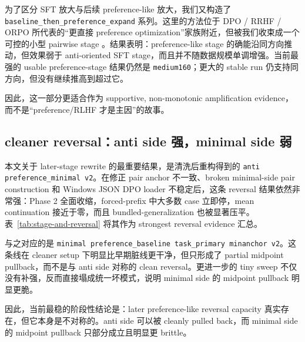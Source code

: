 \documentclass[12pt]{ctexart}
\begin{document}
为了区分 SFT 放大与后续 preference-like 放大，我们又构造了 \texttt{baseline\_then\_preference\_expand} 系列。这里的方法位于 DPO / RRHF / ORPO 所代表的“更直接 preference optimization”家族附近，但被我们收束成一个可控的小型 pairwise stage \citep{rafailov2023dpo,yuan2023rrhf,hong2024orpo}。结果表明：preference-like stage 的确能沿同方向推动，但效果弱于 anti-oriented SFT stage，而且并不随数据规模单调增强。当前最强的 usable preference-stage 结果仍然是 \texttt{medium160}；更大的 stable run 仍支持同方向，但没有继续推高到超过它。

因此，这一部分更适合作为 supportive, non-monotonic amplification evidence，而不是“preference/RLHF 才是主因”的故事。

\subsection{cleaner reversal：anti side 强，minimal side 弱}

本文关于 later-stage rewrite 的最重要结果，是清洗后重构得到的 \texttt{anti \textrightarrow preference\_minimal v2}。在修正 pair anchor 不一致、broken minimal-side pair construction 和 Windows JSON DPO loader 不稳定后，这条 reversal 结果依然非常强：Phase 2 全面收缩，forced-prefix 中大多数 case 立即停，mean continuation 接近于零，而且 bundled-generalization 也被显著压平。表~\ref{tab:stage-and-reversal} 将其作为 strongest reversal evidence 汇总。

与之对应的是 \texttt{minimal \textrightarrow preference\_baseline task\_primary minanchor v2}。这条线在 cleaner setup 下明显比早期脏线更干净，但只形成了 partial midpoint pullback，而不是与 anti side 对称的 clean reversal。更进一步的 tiny sweep 不仅没有补强，反而直接塌成统一坏模式，说明 minimal side 的 midpoint pullback 明显更脆。

因此，当前最稳的阶段性结论是：later preference-like reversal capacity 真实存在，但它本身是不对称的。anti side 可以被 cleanly pulled back，而 minimal side 的 midpoint pullback 只部分成立且明显更 brittle。
\end{document}
